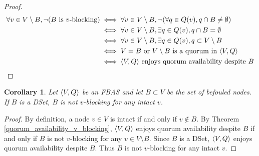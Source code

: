 \documentclass[12pt, psamsfonts]{amsart}
\newtheorem{cor}[thm]{Corollary}
\theoremstyle{definition}
\theoremstyle{remark}
\numberwithin{equation}{section}
\begin{document}
\begin{proof}
    \begin{align*}
        \forall v \in V \setminus B, \neg(\text{$B$ is $v$-blocking})
            &\iff \forall v \in V \setminus B, \neg(\forall q \in Q(v), q \cap B \ne \emptyset) \\
            &\iff \forall v \in V \setminus B, \exists q \in Q(v), q \cap B = \emptyset \\
            &\iff \forall v \in V \setminus B, \exists q \in Q(v), q \subset V \setminus B \\
            &\iff \text{$V = B$ or $V \setminus B$ is a quorum in $\ev{V, Q}$} \\
            &\iff \text{$\ev{V, Q}$ enjoys quorum availability despite $B$}
    \end{align*}
\end{proof}

\begin{cor}
    Let $\ev{V, Q}$ be an FBAS and let $B \subset V$ be the set of befouled nodes.
    If $B$ is a DSet, $B$ is not $v$-blocking for any intact $v$.
\end{cor}

\begin{proof}
    By definition, a node $v \in V$ is intact if and only if $v \notin B$.
    By Theorem \ref{quorum_availability_v_blocking}, $\ev{V, Q}$ enjoys quorum availability despite $B$ if and only if $B$ is not $v$-blocking for any $v \in V \setminus B$.
    Since $B$ is a DSet, $\ev{V, Q}$ enjoys quorum availability despite $B$.
    Thus $B$ is not $v$-blocking for any intact $v$.
\end{proof}
\end{document}
